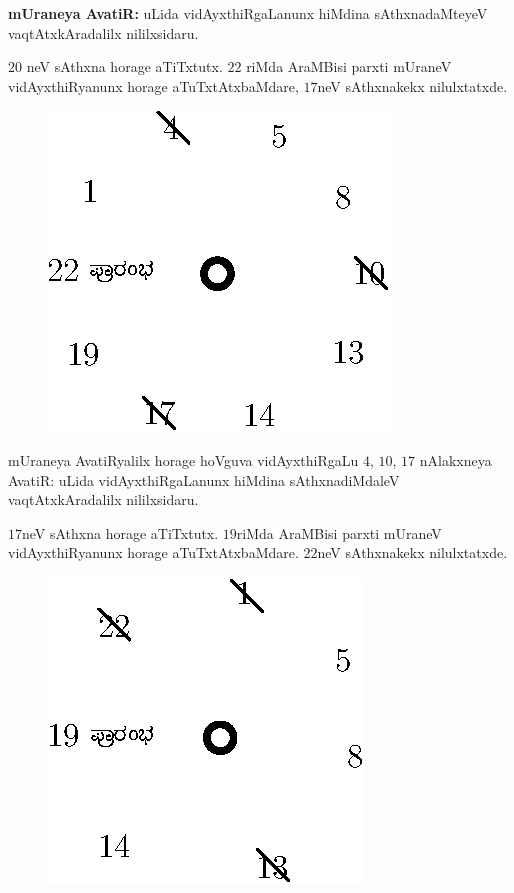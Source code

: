 {\bf mUraneya AvatiR:} uLida vidAyxthiRgaLanunx hiMdina sAthxnadaMteyeV vaqtAtxkAradalilx nililxsidaru.

$20$ neV sAthxna horage aTiTxtutx. $22$ riMda AraMBisi parxti mUraneV vidAyxthiRyanunx horage aTuTxtAtxbaMdare, $17$neV sAthxnakekx nilulxtatxde. 
\begin{figure}[H]
\centering
\includegraphics{src/figures/fig11.eps}
\end{figure}

mUraneya AvatiRyalilx horage hoVguva vidAyxthiRgaLu $4$, $10$, $17$ nAlakxneya AvatiR: uLida vidAyxthiRgaLanunx hiMdina sAthxnadiMdaleV vaqtAtxkAradalilx nililxsidaru.

$17$neV sAthxna horage aTiTxtutx. $19$riMda AraMBisi parxti mUraneV vidAyxthiRyanunx horage aTuTxtAtxbaMdare. $22$neV sAthxnakekx nilulxtatxde. 

\begin{figure}[H]
\centering
\includegraphics{src/figures/fig12.eps}
\end{figure}

